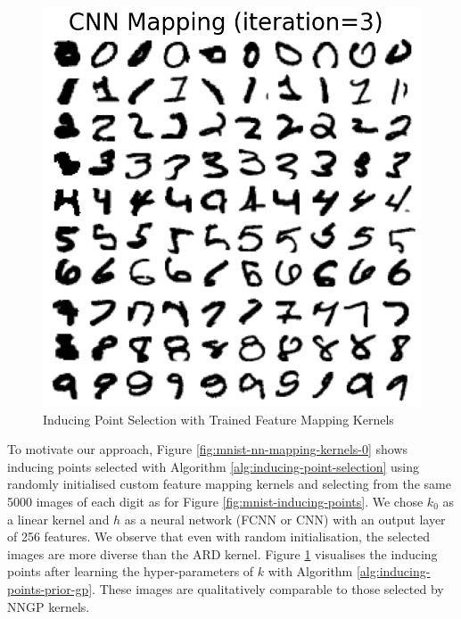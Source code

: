 \documentclass{article}
\numberwithin{equation}{section}
\begin{document}
\begin{figure}[h!]
\begin{minipage}{.25\textwidth}
  \includegraphics[width=\linewidth, trim={0 0 0 1.5cm},clip]{thesis-report/figures/custom_mapping/cnn/iteration_3.png}
\end{minipage}%
\caption{Inducing Point Selection with Trained Feature Mapping Kernels}\label{fig:mnist-nn-mapping-kernels-3}
\end{figure}

To motivate our approach, Figure \ref{fig:mnist-nn-mapping-kernels-0} shows inducing points selected with Algorithm \ref{alg:inducing-point-selection} using randomly initialised custom feature mapping kernels and selecting from the same 5000 images of each digit as for Figure \ref{fig:mnist-inducing-points}. 
We chose $k_0$ as a linear kernel and $h$ as a neural network (FCNN or CNN) with an output layer of 256 features. 
We observe that even with random initialisation, the selected images are more diverse than the ARD kernel.
Figure \ref{fig:mnist-nn-mapping-kernels-3} visualises the inducing points after learning the hyper-parameters of $k$ with Algorithm \ref{alg:inducing-points-prior-gp}.
These images are qualitatively comparable to those selected by NNGP kernels.
\end{document}
